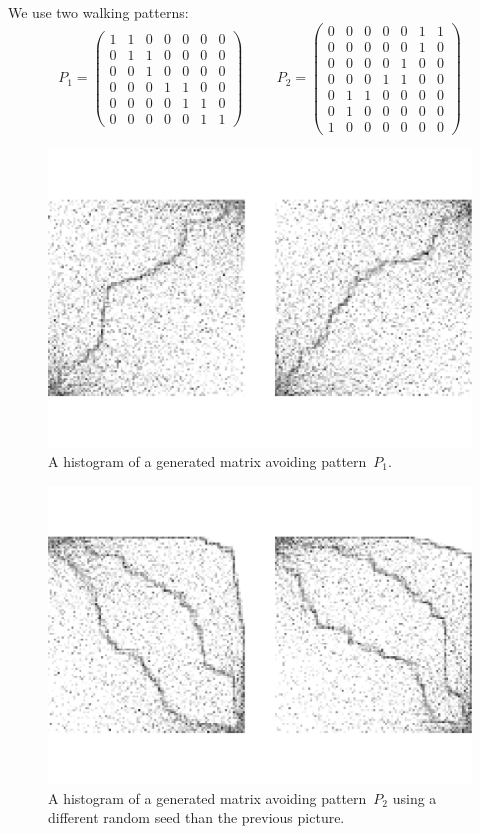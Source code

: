 We use two walking patterns:
$$P_1=\left(\begin{array}{ccccccc}
1 & 1 & 0 & 0 & 0 & 0 & 0 \\
0 & 1 & 1 & 0 & 0 & 0 & 0 \\
0 & 0 & 1 & 0 & 0 & 0 & 0 \\
0 & 0 & 0 & 1 & 1 & 0 & 0 \\
0 & 0 & 0 & 0 & 1 & 1 & 0 \\
0 & 0 & 0 & 0 & 0 & 1 & 1
\end{array}\right)\hspace{1cm}
P_2=\left(\begin{array}{ccccccc}
0 & 0 & 0 & 0 & 0 & 1 & 1 \\
0 & 0 & 0 & 0 & 0 & 1 & 0 \\
0 & 0 & 0 & 0 & 1 & 0 & 0 \\
0 & 0 & 0 & 1 & 1 & 0 & 0 \\
0 & 1 & 1 & 0 & 0 & 0 & 0 \\
0 & 1 & 0 & 0 & 0 & 0 & 0 \\
1 & 0 & 0 & 0 & 0 & 0 & 0
\end{array}\right)$$
\begin{figure}[h!]
\centering
\includegraphics[width=120mm]{../img/walker.pdf}
\caption{A histogram of a generated matrix avoiding pattern~$P_1$.}
\label{walker}
\end{figure}

\begin{figure}[h!]
\centering
\includegraphics[width=120mm]{../img/walker2.pdf}
\caption{A histogram of a generated matrix avoiding pattern~$P_2$ using a different random seed than the previous picture.}
\label{walker2}
\end{figure}